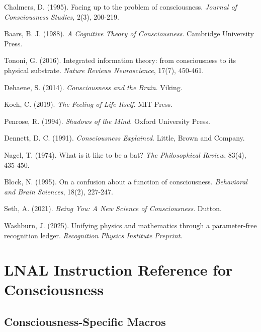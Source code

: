 \documentclass[12pt,a4paper]{article}
\begin{document}
\begin{thebibliography}{99}

Chalmers, D. (1995). Facing up to the problem of consciousness. \textit{Journal of Consciousness Studies}, 2(3), 200-219.

Baars, B. J. (1988). \textit{A Cognitive Theory of Consciousness}. Cambridge University Press.

Tononi, G. (2016). Integrated information theory: from consciousness to its physical substrate. \textit{Nature Reviews Neuroscience}, 17(7), 450-461.

Dehaene, S. (2014). \textit{Consciousness and the Brain}. Viking.

Koch, C. (2019). \textit{The Feeling of Life Itself}. MIT Press.

Penrose, R. (1994). \textit{Shadows of the Mind}. Oxford University Press.

Dennett, D. C. (1991). \textit{Consciousness Explained}. Little, Brown and Company.

Nagel, T. (1974). What is it like to be a bat? \textit{The Philosophical Review}, 83(4), 435-450.

Block, N. (1995). On a confusion about a function of consciousness. \textit{Behavioral and Brain Sciences}, 18(2), 227-247.

Seth, A. (2021). \textit{Being You: A New Science of Consciousness}. Dutton.

Washburn, J. (2025). Unifying physics and mathematics through a parameter-free recognition ledger. \textit{Recognition Physics Institute Preprint}.

\end{thebibliography}

\appendix

\section{LNAL Instruction Reference for Consciousness}

\subsection{Consciousness-Specific Macros}
\end{document}
